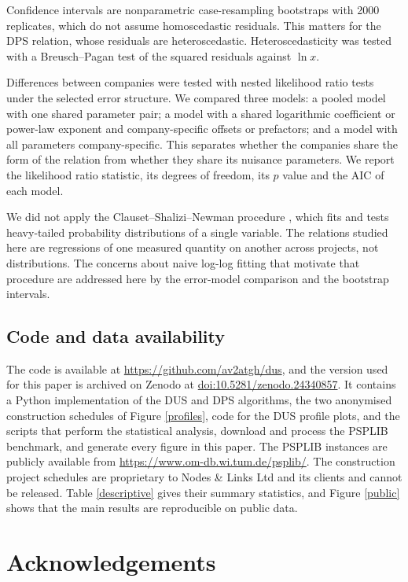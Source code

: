 \documentclass[11pt,a4paper]{article}
\begin{document}
Confidence intervals are nonparametric case-resampling bootstraps with 2000 replicates, which do not assume homoscedastic residuals. This matters for the DPS relation, whose residuals are heteroscedastic. Heteroscedasticity was tested with a Breusch--Pagan test of the squared residuals against $\ln x$.

Differences between companies were tested with nested likelihood ratio tests under the selected error structure. We compared three models: a pooled model with one shared parameter pair; a model with a shared logarithmic coefficient or power-law exponent and company-specific offsets or prefactors; and a model with all parameters company-specific. This separates whether the companies share the form of the relation from whether they share its nuisance parameters. We report the likelihood ratio statistic, its degrees of freedom, its $p$ value and the AIC of each model.

We did not apply the Clauset--Shalizi--Newman procedure \cite{clauset2009powerlaw}, which fits and tests heavy-tailed probability distributions of a single variable. The relations studied here are regressions of one measured quantity on another across projects, not distributions. The concerns about naive log-log fitting that motivate that procedure are addressed here by the error-model comparison and the bootstrap intervals.

\subsection*{Code and data availability}

The code is available at \url{https://github.com/av2atgh/dus}, and the version used for this paper is archived on Zenodo at \href{https://doi.org/10.5281/zenodo.24340857}{doi:10.5281/zenodo.24340857}. It contains a Python implementation of the DUS and DPS algorithms, the two anonymised construction schedules of Figure \ref{profiles}, code for the DUS profile plots, and the scripts that perform the statistical analysis, download and process the PSPLIB benchmark, and generate every figure in this paper. The PSPLIB instances are publicly available from \url{https://www.om-db.wi.tum.de/psplib/}. The construction project schedules are proprietary to Nodes \& Links Ltd and its clients and cannot be released. Table \ref{descriptive} gives their summary statistics, and Figure \ref{public} shows that the main results are reproducible on public data.

\section*{Acknowledgements}
\end{document}
